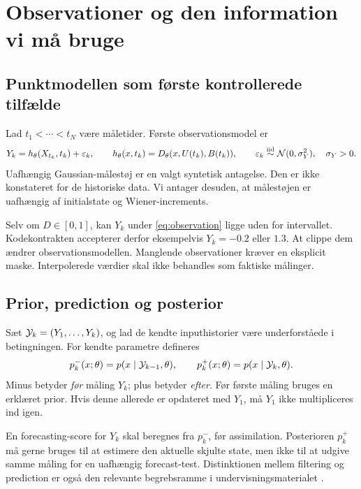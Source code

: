 \section{Observationer og den information vi må bruge}
\subsection{Punktmodellen som første kontrollerede tilfælde}
Lad \(t_1<\cdots<t_N\) være måletider. Første observationsmodel er
\begin{equation}
 Y_k=h_\theta(X_{t_k},t_k)+\varepsilon_k,\qquad
 h_\theta(x,t_k)=D_\theta(x,U(t_k),B(t_k)),\qquad
 \varepsilon_k\overset{\rm iid}{\sim}\mathcal N(0,\sigma_Y^2),\quad\sigma_Y>0.
 \label{eq:observation}
\end{equation}
Uafhængig Gaussian-målestøj er en valgt syntetisk antagelse. Den er ikke konstateret for de historiske data. Vi antager desuden, at målestøjen er uafhængig af initialstate og Wiener-increments.

Selv om \(D\in[0,1]\), kan \(Y_k\) under \eqref{eq:observation} ligge uden for intervallet. Kodekontrakten accepterer derfor eksempelvis \(Y_k=-0.2\) eller \(1.3\). At clippe dem ændrer observationsmodellen. Manglende observationer kræver en eksplicit maske. Interpolerede værdier skal ikke behandles som faktiske målinger.

\subsection{Prior, prediction og posterior}
Sæt \(\mathcal Y_k=(Y_1,\ldots,Y_k)\), og lad de kendte inputhistorier være underforståede i betingningen. For kendte parametre defineres
\begin{equation}
 p_k^-(x;\theta)=p(x\mid\mathcal Y_{k-1},\theta),\qquad
 p_k^+(x;\theta)=p(x\mid\mathcal Y_k,\theta).
 \label{eq:priorposterior}
\end{equation}
Minus betyder \emph{før} måling \(Y_k\); plus betyder \emph{efter}. Før første måling bruges en erklæret prior. Hvis denne allerede er opdateret med \(Y_1\), må \(Y_1\) ikke multipliceres ind igen.

En forecasting-score for \(Y_k\) skal beregnes fra \(p_k^-\), før assimilation. Posterioren \(p_k^+\) må gerne bruges til at estimere den aktuelle skjulte state, men ikke til at udgive samme måling for en uafhængig forecast-test. Distinktionen mellem filtering og prediction er også den relevante begrebsramme i undervisningsmaterialet \cite{lecture}.

